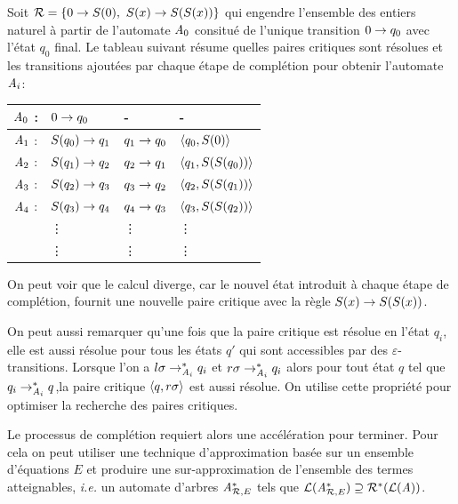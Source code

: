 \begin{example}
  Soit $\mathcal R = \{0 \rightarrow S(0),\ S(x) \rightarrow S(S(x))\}$ qui engendre l'ensemble des entiers naturel
  à partir de l'automate $\mathit A_0$ consitué de l'unique transition $0 \rightarrow q_0$ avec l'état $q_0$ final.
  Le tableau suivant résume quelles paires critiques sont résolues et les transitions ajoutées par chaque étape de complétion
  pour obtenir l'automate $\mathit A_i$:
  \begin{center}
    \begin{tabular}{|cll||l|}
      \hline
      $\mathit A_0$ : & $0 \rightarrow q_0$ & - & - \\
      \hline
      $\mathit A_1$ : & $S (q_0) \rightarrow q_1$ & $q_1 \rightarrow q_0$ & $\langle q_0, S(0)\rangle$\\
      \hline
      $\mathit A_2$ : & $S (q_1) \rightarrow q_2$ & $q_2 \rightarrow q_1$ & $\langle q_1, S(S(q_0))\rangle$\\
      \hline
      $\mathit A_3$ : & $S (q_2) \rightarrow q_3$ & $q_3 \rightarrow q_2$ & $\langle q_2, S(S(q_1))\rangle$\\
      \hline
      $\mathit A_4$ : & $S (q_3) \rightarrow q_4$ & $q_4 \rightarrow q_3$ & $\langle q_3, S(S(q_2))\rangle$\\
      & \vdots & \vdots & \vdots \\
      & \vdots & \vdots & \vdots \\
      \hline
    \end{tabular}
  \end{center}

  On peut voir que le calcul diverge, car le nouvel état introduit
  à chaque étape de complétion, fournit une nouvelle paire critique avec la règle $S(x) \rightarrow S(S(x))$.

  On peut aussi remarquer qu'une fois que la paire critique est résolue en l'état $q_i$,
  elle est aussi résolue pour tous les états $q'$ qui sont accessibles par des $\varepsilon$-transitions.
  Lorsque l'on a $l\sigma \rightarrow^*_{\mathit A_i} q_i$ et $r\sigma \rightarrow^*_{\mathit A_i} q_i$ alors pour tout état $q$ tel
  que $q_i \rightarrow^*_{\mathit A_i} q$,la paire critique $\langle q, r\sigma\rangle$ est aussi résolue. On utilise cette
  propriété pour optimiser la recherche des paires critiques.
\end{example}


Le processus de complétion requiert alors une accélération pour terminer. Pour cela on peut
utiliser une technique d'approximation basée sur un ensemble d'équations $E$ et produire 
une sur-approximation de l'ensemble des termes atteignables, \textit{i.e.} un automate d'arbres
$\mathit A^*_{\mathcal R,E}$ tels que $\mathcal{L}(\mathit A^*_{\mathcal R,E}) \supseteq \mathcal R^*(\mathcal{L}(\mathit A))$.

